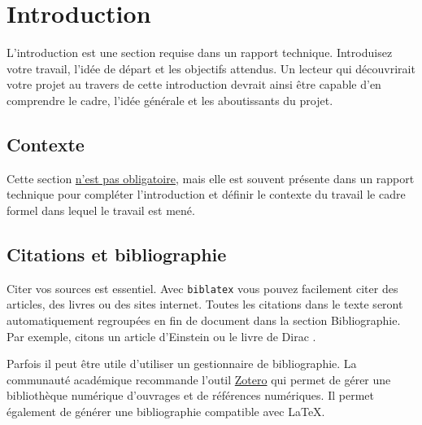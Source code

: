 \documentclass[
    iai, %
    eai, %
    confidential, %
]{heig-tb}
\begin{document}
\maketitle
\frontmatter
\clearemptydoublepage

\preamble
\authentification

\begin{abstract}

\end{abstract}

\clearemptydoublepage
{
    \tableofcontents
    \let\cleardoublepage\clearpage
    \listoffigures
    \let\cleardoublepage\clearpage
    \listoftables
    \let\cleardoublepage\clearpage
    \listoflistings
}

\printnomenclature
\clearemptydoublepage
{}

\mainmatter
\chapter{Introduction}
L'introduction est une section requise dans un rapport technique. Introduisez votre travail, l'idée de départ et les objectifs attendus. Un lecteur qui découvrirait votre projet au travers de cette introduction devrait ainsi être capable d'en comprendre le cadre, l'idée générale et les aboutissants du projet.

\section{Contexte}
Cette section \underline{n'est pas obligatoire}, mais elle est souvent présente dans un rapport technique pour compléter l'introduction et définir le contexte du travail \cad le cadre formel dans lequel le travail est mené.

\section{Citations et bibliographie}
Citer vos sources est essentiel. Avec \texttt{biblatex} vous pouvez facilement citer des articles, des livres ou des sites internet. Toutes les citations dans le texte seront automatiquement regroupées en fin de document dans la section \guillemotleft Bibliographie\guillemotright. Par exemple, citons un article d'Einstein \cite{einstein} ou le livre de Dirac \cite{dirac}.

Parfois il peut être utile d'utiliser un gestionnaire de bibliographie. La communauté académique recommande l'outil \href{https://www.zotero.org/}{Zotero} qui permet de gérer une bibliothèque numérique d'ouvrages et de références numériques. Il permet également de générer une bibliographie compatible avec \LaTeX.
\end{document}

